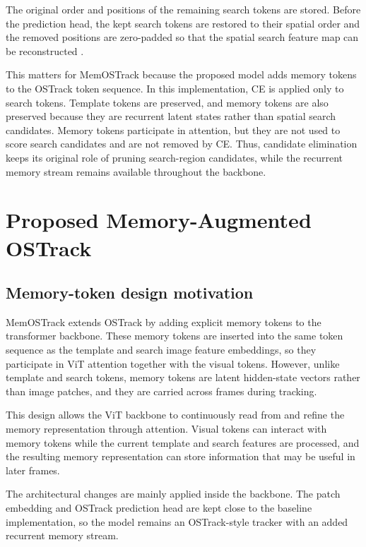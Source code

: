 \documentclass[bachelorthesis]{fer}
\numberwithin{equation}{chapter}
\begin{document}
    The original order and positions of the remaining search tokens are stored. Before the
    prediction head, the kept search tokens are restored to their spatial order and the
    removed positions are zero-padded so that the spatial search feature map can be
    reconstructed \cite{ye2022ostrack}.

    This matters for MemOSTrack because the proposed model adds memory tokens to the OSTrack
    token sequence. In this implementation, CE is applied only to search tokens. Template
    tokens are preserved, and memory tokens are also preserved because they are recurrent
    latent states rather than spatial search candidates. Memory tokens participate in
    attention, but they are not used to score search candidates and are not removed by CE.
    Thus, candidate elimination keeps its original role of pruning search-region candidates,
    while the recurrent memory stream remains available throughout the backbone.


    \chapter{Proposed Memory-Augmented OSTrack}\label{proposed-memory-augmented-ostrack}


    \section{Memory-token design motivation}\label{memory-token-design-motivation}

    MemOSTrack extends OSTrack by adding explicit memory tokens to the transformer backbone.
    These memory tokens are inserted into the same token sequence as the template
    and search image feature embeddings, so they participate in ViT attention together with the visual
    tokens. However, unlike template and search tokens, memory tokens are latent hidden-state vectors
    rather than image patches, and they are carried across frames during tracking.

    This design allows the ViT backbone to continuously read from and refine the memory representation
    through attention. Visual tokens can interact with memory tokens while the current
    template and search features are processed, and the resulting memory representation can
    store information that may be useful in later frames.

    The architectural changes are mainly applied inside the backbone. The patch embedding
    and OSTrack prediction head are kept close to the baseline implementation, so the model
    remains an OSTrack-style tracker with an added recurrent memory stream.
\end{document}
